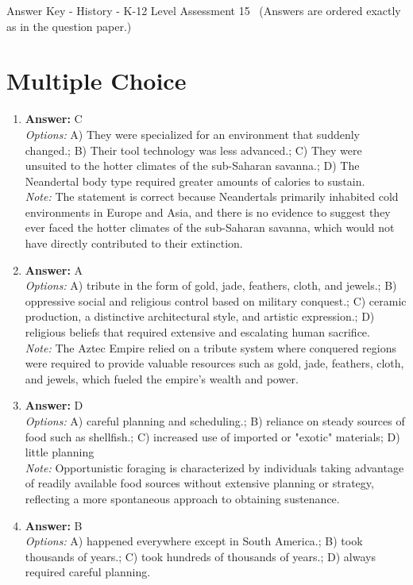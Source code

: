 \documentclass[12pt]{article}
\begin{document}
\begin{center}
Answer Key - History - K-12 Level Assessment 15 \
\small (Answers are ordered exactly as in the question paper.)
\end{center}

\section*{Multiple Choice}
\begin{enumerate}[label=\arabic*.]
\item \textbf{Answer:} C
\\ \textit{Options:} A) They were specialized for an environment that suddenly changed.; B) Their tool technology was less advanced.; C) They were unsuited to the hotter climates of the sub-Saharan savanna.; D) The Neandertal body type required greater amounts of calories to sustain.
\\ \textit{Note:} The statement is correct because Neandertals primarily inhabited cold environments in Europe and Asia, and there is no evidence to suggest they ever faced the hotter climates of the sub-Saharan savanna, which would not have directly contributed to their extinction.
\item \textbf{Answer:} A
\\ \textit{Options:} A) tribute in the form of gold, jade, feathers, cloth, and jewels.; B) oppressive social and religious control based on military conquest.; C) ceramic production, a distinctive architectural style, and artistic expression.; D) religious beliefs that required extensive and escalating human sacrifice.
\\ \textit{Note:} The Aztec Empire relied on a tribute system where conquered regions were required to provide valuable resources such as gold, jade, feathers, cloth, and jewels, which fueled the empire's wealth and power.
\item \textbf{Answer:} D
\\ \textit{Options:} A) careful planning and scheduling.; B) reliance on steady sources of food such as shellfish.; C) increased use of imported or "exotic" materials; D) little planning
\\ \textit{Note:} Opportunistic foraging is characterized by individuals taking advantage of readily available food sources without extensive planning or strategy, reflecting a more spontaneous approach to obtaining sustenance.
\item \textbf{Answer:} B
\\ \textit{Options:} A) happened everywhere except in South America.; B) took thousands of years.; C) took hundreds of thousands of years.; D) always required careful planning.

\end{enumerate}
\end{document}
